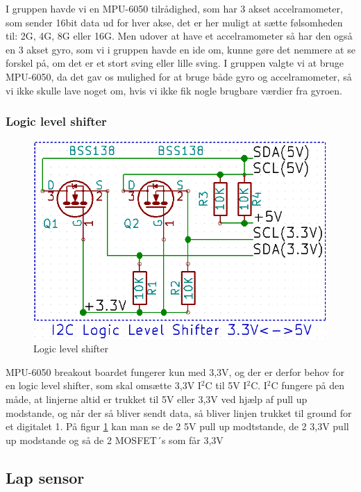 I gruppen havde vi en MPU-6050 tilrådighed, som har 3 akset accelramometer, som sender 16bit data ud for hver akse, det er her muligt at sætte følsomheden til: \textpm 2G, 4G, 8G eller 16G. Men udover at have et accelramometer så har den også en 3 akset gyro, som vi i gruppen havde en ide om, kunne gøre det nemmere at se forskel på, om det er et stort sving eller  lille sving. I gruppen valgte vi at bruge MPU-6050, da det gav os mulighed for at bruge både gyro og accelramometer, så vi ikke skulle lave noget om, hvis vi ikke fik nogle brugbare værdier fra gyroen.
\linebreak

\subsubsection{Logic level shifter}

\begin{figure}[h]\centering
	\includegraphics[scale=0.4]{Billeder/LogicLevelShifter.PNG}
	\caption{Logic level shifter}
	\label{fig:LogiLevelShifter}
\end{figure}

MPU-6050 breakout boardet fungerer kun med 3,3V, og der er derfor behov for en logic level shifter, som skal omsætte 3,3V I$^{\text{2}}$C til 5V I$^{\text{2}}$C. I$^{\text{2}}$C fungere på den måde, at linjerne altid er trukket til 5V eller 3,3V ved hjælp af pull up modstande, og når der så bliver sendt data, så bliver linjen trukket til ground for et digitalet 1.
På figur \ref{fig:LogiLevelShifter} kan man se de 2 5V pull up modtstande, de 2 3,3V pull up modstande og så de 2 MOSFET´s som får 3,3V


\subsection{Lap sensor}

